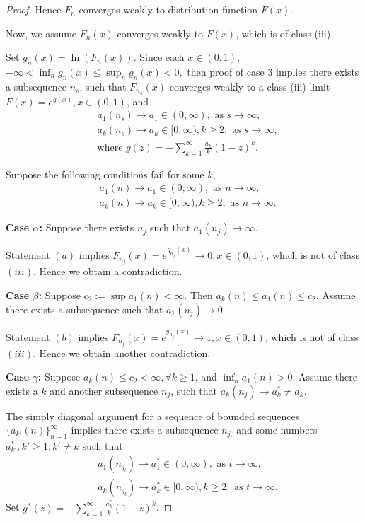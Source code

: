 \documentclass[12pt]{article}
\theoremstyle{plain}
\theoremstyle{definition}
\theoremstyle{remark}
\begin{document}
\begin{proof}
Hence $F_{n}$ converges weakly to distribution function $F(x)$.

Now, we assume $F_n(x)$ converges weakly to $F(x)$, which is of class (iii). 

Set $g_n(x)=\ln (F_n(x))$. Since each $x\in (0,1)$, 
$-\infty<\inf_{n} g_{n}(x)\leq \sup_{n} g_{n}(x)<0,$
then proof of case 3 implies there exists a subsequence $n_s$, such that $F_{n_s}(x)$ converges weakly to a class (iii) limit $F(x)=e^{g(x)},x\in (0,1)$, and
\begin{align*}
    &a_{1}{(n_s)}\rightarrow a_1 \in (0,\infty), \text{ as } s\rightarrow \infty,\\
    &a_{k}{(n_s)}\rightarrow a_k \in [0,\infty),k\geq 2, \text{ as } s\rightarrow \infty,\\
    &\text{where }g(z)=-\sum_{k=1}^\infty \frac{a_k}{k}(1-z)^k.
\end{align*}


Suppose the following conditions fail for some $k$,
\begin{align*}
    &a_{1}{(n)}\rightarrow a_1 \in (0,\infty), \text{ as } n\rightarrow \infty,\\
    &a_{k}{(n)}\rightarrow a_k \in [0,\infty),k\geq 2, \text{ as } n\rightarrow \infty.
\end{align*}

\textbf{Case $\alpha$:}
Suppose there exists $n_j$ such that $a_1(n_j)\rightarrow \infty$.

Statement $(a)$ implies $F_{n_j}(x)=e^{g_{n_j}(x)}\rightarrow0,x\in (0,1)$, which is not of class $(iii)$. 
Hence we obtain a contradiction.

\textbf{Case $\beta$:}
Suppose $c_2:=\sup a_1(n)<\infty$. Then $a_k(n)\leq a_1(n)\leq c_2$. Assume there exists a subsequence such that $a_1(n_j)\rightarrow 0$.

Statement $(b)$ implies $F_{n_j}(x)=e^{g_{n_j}(x)}\rightarrow 1,x\in (0,1)$, which is not of class $(iii)$. 
Hence we obtain another contradiction.

\textbf{Case $\gamma$:}
Suppose $a_k(n)\leq c_2<\infty,\forall k\geq 1$, and $\inf_n a_1(n)>0$. Assume there exists a $k$ and another subsequence $n_j$, such that $a_k(n_j)\rightarrow a_k^*\neq a_k$.

The simply diagonal argument for a sequence of bounded sequences $\{a_{k'}(n)\}_{n=1}^\infty$ implies there exists a subsequence $n_{j_t}$ and some numbers $a_{k'}^*,k'\geq 1, k'\neq k $ such that 
\begin{align*}
    &a_{1}{(n_{j_t})}\rightarrow a_1^* \in (0,\infty), \text{ as } t\rightarrow \infty,\\
    &a_{k}{(n_{j_t})}\rightarrow a_k^* \in [0,\infty),k\geq 2, \text{ as } t\rightarrow \infty.
\end{align*}
Set $g^*(z)=-\sum_{k=1}^\infty \frac{a_k^*}{k}(1-z)^k$. 


\end{proof}
\end{document}
